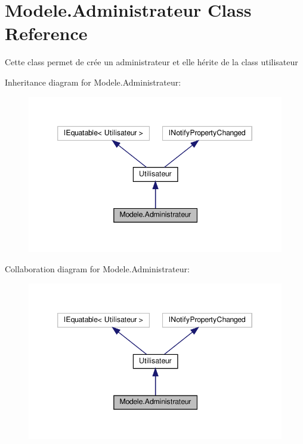 \hypertarget{classModele_1_1Administrateur}{}\section{Modele.\+Administrateur Class Reference}
\label{classModele_1_1Administrateur}


Cette class permet de crée un administrateur et elle hérite de la class utilisateur  




Inheritance diagram for Modele.\+Administrateur\+:
\nopagebreak
\begin{figure}[H]
\begin{center}
\leavevmode
\includegraphics[width=346pt]{classModele_1_1Administrateur__inherit__graph}
\end{center}
\end{figure}


Collaboration diagram for Modele.\+Administrateur\+:
\nopagebreak
\begin{figure}[H]
\begin{center}
\leavevmode
\includegraphics[width=346pt]{classModele_1_1Administrateur__coll__graph}
\end{center}
\end{figure}
